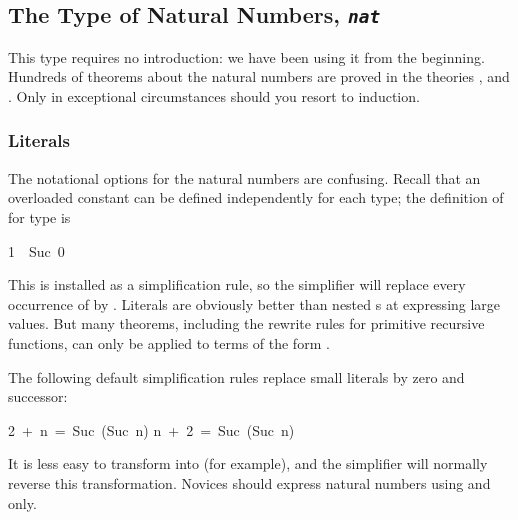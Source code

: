 \subsection{The Type of Natural Numbers, {\tt\slshape nat}}

%
This type requires no introduction: we have been using it from the
beginning.  Hundreds of theorems about the natural numbers are
proved in the theories ,  and .  Only
in exceptional circumstances should you resort to induction.

\subsubsection{Literals}
%
The notational options for the natural  numbers are confusing.  Recall that an
overloaded constant can be defined independently for each type; the definition
of  for type  is
\begin{isabelle}
1\ \isasymequiv\ Suc\ 0
\end{isabelle}
This is installed as a simplification rule, so the simplifier will replace
every occurrence of  by .  Literals are obviously
better than nested s at expressing large values.  But many theorems,
including the rewrite rules for primitive recursive functions, can only be
applied to terms of the form .

The following default  simplification rules replace
small literals by zero and successor: 
\begin{isabelle}
2\ +\ n\ =\ Suc\ (Suc\ n)
\isanewline
n\ +\ 2\ =\ Suc\ (Suc\ n)
\end{isabelle}
It is less easy to transform  into  (for example), and
the simplifier will normally reverse this transformation.  Novices should
express natural numbers using  and  only.

